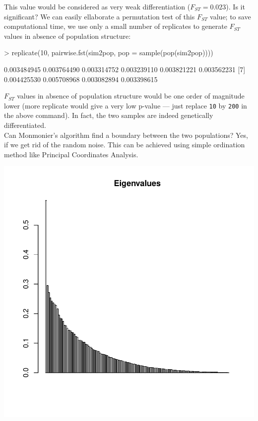 \documentclass{article}
\begin{document}
\noindent This value would be considered as very weak differentiation ($F_{ST}=0.023$).
Is it significant?
We can easily ellaborate a permutation test of this $F_{ST}$ value; to save computational time, we
use only a small number of replicates to generate $F_{ST}$ values in absence of population structure:
\begin{Schunk}
\begin{Sinput}
> replicate(10, pairwise.fst(sim2pop, pop = sample(pop(sim2pop))))
\end{Sinput}
\begin{Soutput}
 [1] 0.003484945 0.003764490 0.003314752 0.003239110 0.003821221 0.003562231
 [7] 0.004425530 0.005708968 0.003082894 0.003398615
\end{Soutput}
\end{Schunk}
$F_{ST}$ values in absence of population structure would be one order of magnitude lower (more
replicate would give a very low p-value --- just replace \texttt{10} by \texttt{200} in the above command).
In fact, the two samples are indeed genetically differentiated.
\\

Can Monmonier's algorithm find a boundary between the two populations?
Yes, if we get rid of the random noise.
This can be achieved using simple ordination method like Principal Coordinates Analysis.

\begin{Schunk}
\end{Schunk}
\includegraphics{figs/base-mon6}
\end{document}
